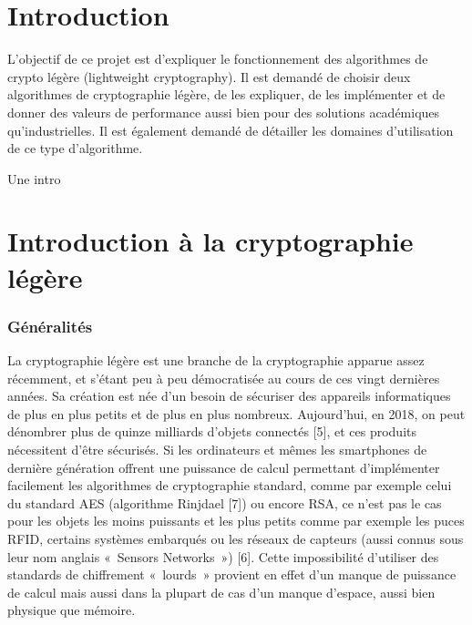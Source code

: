 \clearpage
\part*{Introduction}

L'objectif de ce projet est d'expliquer le fonctionnement des algorithmes de crypto légère (lightweight cryptography).
Il est demandé de choisir deux algorithmes de cryptographie légère, de les expliquer,
de les implémenter et de donner des valeurs de performance aussi bien pour des solutions académiques qu'industrielles.
Il est également demandé de détailler les domaines d'utilisation de ce type d'algorithme.

Une intro

	\clearpage


	\newpage

\newpage
\part{Introduction à la cryptographie légère}



	\section{Généralités}
	La cryptographie légère est une branche de la cryptographie apparue assez récemment,  et s’étant peu à peu démocratisée au cours de ces vingt dernières années.
	Sa création est née d’un besoin de sécuriser des appareils informatiques de plus en plus petits et de plus en plus nombreux.
	Aujourd’hui, en 2018, on peut dénombrer  plus de  quinze milliards d’objets connectés [5], et ces produits nécessitent d’être sécurisés.
	Si les ordinateurs et mêmes les smartphones de dernière génération offrent une puissance de calcul permettant d’implémenter facilement les algorithmes de cryptographie standard,
	comme par exemple celui du standard AES (algorithme Rinjdael [7]) ou encore RSA,
	ce n’est pas le cas pour les objets les moins puissants et les plus petits comme par exemple les puces RFID,
	certains systèmes embarqués ou les réseaux de capteurs (aussi connus sous leur nom anglais « Sensors Networks ») [6].
	Cette impossibilité d’utiliser des standards de chiffrement « lourds » provient en effet d’un manque de puissance de calcul mais aussi dans la plupart de cas d’un manque d’espace, aussi bien physique que mémoire.  

